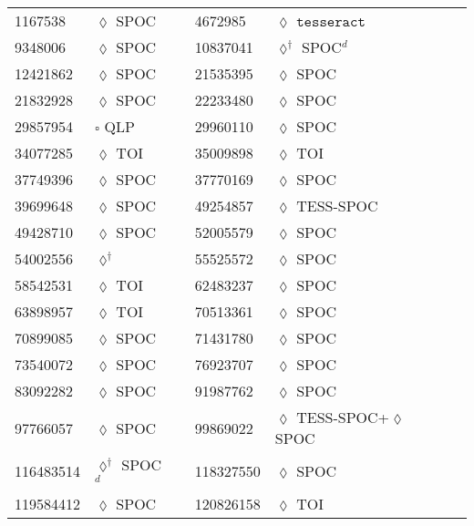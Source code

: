 \begin{longtable}{llrllr}
1167538 & $\lozenge$ SPOC & \cite{TIC_1167538} & 4672985 & $\lozenge$ $\texttt{tesseract}$ & \cite{TIC_4672985} \\
9348006 & $\lozenge$ SPOC & \cite{TIC_232540264} & 10837041 & $\lozenge^\dagger$ SPOC$^d$ & \cite{TIC_10837041} \\
12421862 & $\lozenge$ SPOC & \cite{TIC_70513361} & 21535395 & $\lozenge$ SPOC & \cite{TIC_232540264} \\
21832928 & $\lozenge$ SPOC & \cite{TIC_232540264} & 22233480 & $\lozenge$ SPOC & \cite{TIC_22233480} \\
29857954 & $\square$ QLP & \cite{TIC_29857954} & 29960110 & $\lozenge$ SPOC & \cite{TIC_29960110} \\
34077285 & $\lozenge$ TOI & \cite{TIC_154872375} & 35009898 & $\lozenge$ TOI & \cite{TIC_154872375} \\
37749396 & $\lozenge$ SPOC & \cite{TIC_37749396} & 37770169 & $\lozenge$ SPOC & \cite{TIC_70513361} \\
39699648 & $\lozenge$ SPOC & \cite{TIC_232540264} & 49254857 & $\lozenge$ TESS-SPOC & \cite{TIC_332534326} \\
49428710 & $\lozenge$ SPOC & \cite{TIC_219016883} & 52005579 & $\lozenge$ SPOC & \cite{TIC_52005579} \\
54002556 & $\lozenge^\dagger$ & \cite{TIC_54002556} & 55525572 & $\lozenge$ SPOC & \cite{TIC_55525572} \\
58542531 & $\lozenge$ TOI & \cite{TIC_154872375} & 62483237 & $\lozenge$ SPOC & \cite{TIC_428699140} \\
63898957 & $\lozenge$ TOI & \cite{TIC_154872375} & 70513361 & $\lozenge$ SPOC & \cite{TIC_70513361} \\
70899085 & $\lozenge$ SPOC & \cite{TIC_70899085} & 71431780 & $\lozenge$ SPOC & \cite{TIC_232540264} \\
73540072 & $\lozenge$ SPOC & \cite{TIC_73540072} & 76923707 & $\lozenge$ SPOC & \cite{TIC_76923707} \\
83092282 & $\lozenge$ SPOC & \cite{TIC_83092282} & 91987762 & $\lozenge$ SPOC & \cite{TIC_232540264} \\
97766057 & $\lozenge$ SPOC & \cite{TIC_97766057} & 99869022 & $\lozenge$ TESS-SPOC+$\lozenge$ SPOC & \cite{TIC_99869022} \\
116483514 & $\lozenge^\dagger$ SPOC$^d$ & \cite{TIC_10837041} & 118327550 & $\lozenge$ SPOC & \cite{TIC_118327550} \\
119584412 & $\lozenge$ SPOC & \cite{TIC_119584412} & 120826158 & $\lozenge$ TOI & \cite{TIC_154872375} \\

\end{longtable}
